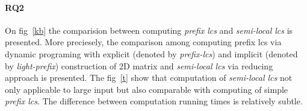 \paragraph{RQ2}

On fig~\ref{kb} the comparision between computing \emph{prefix lcs} and \emph{semi-local lcs} is presented.
More preciesely, the comparison among computing prefix lcs via dynamic programing with explicit (denoted by \emph{prefix-lcs}) and implicit (denoted by \emph{light-prefix}) construction of 2D matrix and \emph{semi-local lcs} via reducing approach is presented.
The fig~\ref{t} show that computation of \emph{semi-local lcs} not only applicable to large input but also comparable with computing of simple \emph{prefix lcs}.
The difference between computation running times is relatively subtle. 
 








 
